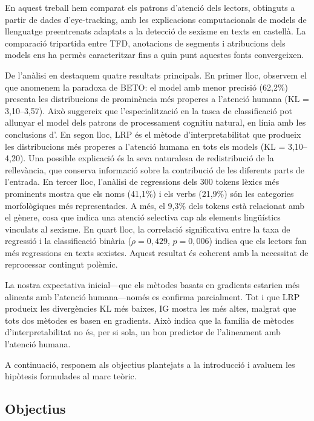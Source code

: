 En aquest treball hem comparat els patrons d'atenció dels lectors, obtinguts a partir de dades d'eye-tracking, amb les explicacions computacionals de models de llenguatge preentrenats adaptats a la detecció de sexisme en texts en castellà.
La comparació tripartida entre TFD, anotacions de segments i atribucions dels models ens ha permès caracteritzar fins a quin punt aquestes fonts convergeixen.

De l'anàlisi en destaquem quatre resultats principals.
En primer lloc, observem el que anomenem la paradoxa de BETO: el model amb menor precisió (62,2\%) presenta les distribucions de prominència més properes a l'atenció humana (KL = 3,10--3,57).
Això suggereix que l'especialització en la tasca de classificació pot allunyar el model dels patrons de processament cognitiu natural, en línia amb les conclusions d'\textcite{ikhwantriLookingDeepEyes2023}.
En segon lloc, LRP és el mètode d'interpretabilitat que produeix les distribucions més properes a l'atenció humana en tots els models (KL = 3,10--4,20). Una possible explicació és la seva naturalesa de redistribució de la rellevància, que conserva informació sobre la contribució de les diferents parts de l'entrada.
En tercer lloc, l'anàlisi de regressions dels 300 tokens lèxics més prominents mostra que els noms (41,1\%) i els verbs (21,9\%) són les categories morfològiques més representades. A més, el 9,3\% dels tokens està relacionat amb el gènere, cosa que indica una atenció selectiva cap als elements lingüístics vinculats al sexisme.
En quart lloc, la correlació significativa entre la taxa de regressió i la classificació binària ($\rho = 0,429$, $p = 0,006$) indica que els lectors fan més regressions en texts sexistes. Aquest resultat és coherent amb la necessitat de reprocessar contingut polèmic.

La nostra expectativa inicial---que els mètodes basats en gradients estarien més alineats amb l'atenció humana---només es confirma parcialment.
Tot i que LRP produeix les divergències KL més baixes, IG mostra les més altes, malgrat que tots dos mètodes es basen en gradients.
Això indica que la família de mètodes d'interpretabilitat no és, per si sola, un bon predictor de l'alineament amb l'atenció humana.

A continuació, responem als objectius plantejats a la introducció i avaluem les hipòtesis formulades al marc teòric.

\subsection*{Objectius}

